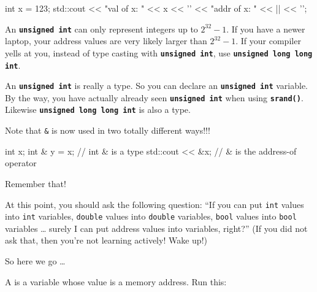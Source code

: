\begin{consolethree}[escapeinside=||]
int x = 123;
std::cout << "val of x: " << x
          << '\n' << "addr of x: "
          << ||
          << '\n';
\end{consolethree}
An \texttt{\textbf{unsigned int}} can only represent integers up to $2^{32} - 1$. If you have a newer laptop, your address values are very likely larger than $2^{32} - 1$. If your compiler yells at you, instead of type casting with \texttt{\textbf{unsigned int}}, use \texttt{\textbf{unsigned long long int}}.

An \texttt{\textbf{unsigned int}} is really a type. So you can declare an \texttt{\textbf{unsigned int}} variable. By the way, you have actually already seen \texttt{\textbf{unsigned int}} when using \texttt{\textbf{srand()}}. Likewise \texttt{\textbf{unsigned long long int}} is also a type.







Note that \texttt{\&} is now used in two totally different ways!!!

\begin{consolethree}[escapeinside=||]
int x;
int & y = x;     // int & is a type
std::cout << &x; // & is the address-of operator
\end{consolethree}
Remember that!

\newpage{}

At this point, you should ask the following question: ``If you can put \texttt{int} values into \texttt{int} variables, \texttt{double} values into \texttt{double} variables, \texttt{bool} values into \texttt{bool} variables \ldots{} surely I can put address values into variables, right?'' (If you did not ask that, then you're not learning actively! Wake up!)

So here we go \ldots{}

A  is a variable whose value is a memory
address. Run this:

